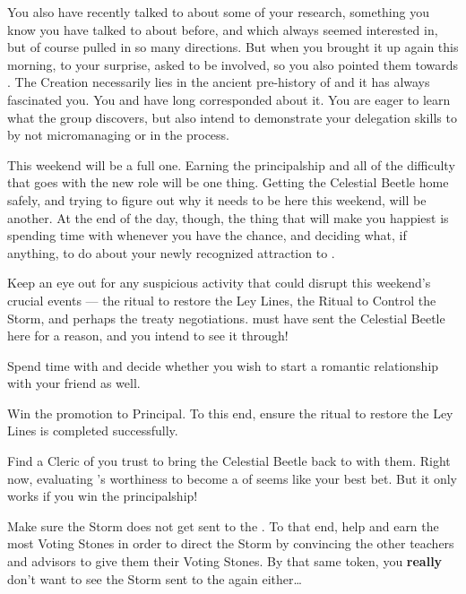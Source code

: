 \documentclass[char]{GL2020}
\begin{document}
You also have recently talked to \cLibrarian{\full} about some of your research, something you know you have talked to \cLibrarian{} about before, and which \cLibrarian{\they} always seemed interested in, but of course pulled in so many directions. But when you brought it up again this morning, to your surprise, \cLibrarian{\they} asked to be involved, so you also pointed them towards \cEbbPriest{}. The Creation necessarily lies in the ancient pre-history of \pEarth{} and it has always fascinated you. You and \cEbbPriest{} have long corresponded about it. You are eager to learn what the group discovers, but also intend to demonstrate your delegation skills to \cPrincipal{} by not micromanaging \cHeadScientist{} or \cLibrarian{} in the process.

This weekend will be a full one. Earning the principalship and all of the difficulty that goes with the new role will be one thing. Getting the Celestial Beetle home safely, and trying to figure out why it needs to be here this weekend, will be another. At the end of the day, though, the thing that will make you happiest is spending time with \cJuniorStatesman{} whenever you have the chance, and deciding what, if anything, to do about your newly recognized attraction to \cEthics{}.

\begin{itemz}
    \item Keep an eye out for any suspicious activity that could disrupt this weekend’s crucial events — the ritual to restore the Ley Lines, the Ritual to Control the Storm, and perhaps the treaty negotiations. \cTechGod{} must have sent the Celestial Beetle here for a reason, and you intend to see it through! 
    \item Spend time with \cJuniorStatesman{} and decide whether you wish to start a romantic relationship with your friend \cEthics{} as well.
    \item Win the promotion to Principal. To this end, ensure the ritual to restore the Ley Lines is completed successfully.
    \item Find a Cleric of \cTechGod{} you trust to bring the Celestial Beetle back to \pTech{} with them. Right now, evaluating \cHeadScientist{}'s worthiness to become a \cHeadScientist{\cleric} of \cTechGod{} seems like your best bet. But it only works if you win the principalship!
    \item Make sure the Storm does not get sent to the \pTech{}. To that end, help \cTechStar{} and \cHeir{} earn the most Voting Stones in order to direct the Storm by convincing the other teachers and advisors to give them their Voting Stones. By that same token, you \textbf{really} don’t want to see the Storm sent to the \pShip{} again either\ldots 
\end{itemz}
\end{document}
